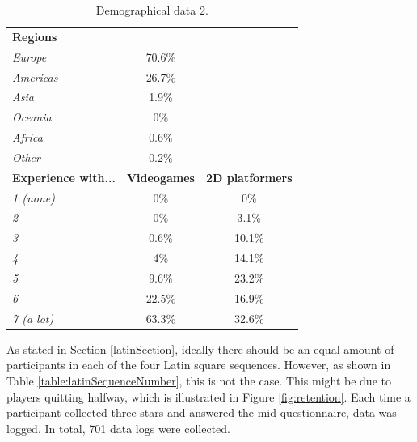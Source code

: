 \begin{table} \centering
\small
\caption{Demographical data 2.}
\label{table:demographics2}
\begin{tabular}{lcc}
\toprule
\textbf{Regions}                      &                & \textbf{}               \\ 
\textit{Europe}                      & 70.6\%         &                         \\
\textit{Americas}                    & 26.7\%         &                         \\
\textit{Asia}                        & 1.9\%          &                         \\
\textit{Oceania}                     & 0\%            &                         \\
\textit{Africa}                      & 0.6\%          &                         \\
\textit{Other}                       & 0.2\%          &                         \\
\textbf{Experience with...} & \textbf{Videogames} & \textbf{2D platformers} \\
\textit{1 (none)}                           & 0\%            & 0\%                     \\
\textit{2}                           & 0\%            & 3.1\%                   \\ 
\textit{3}                           & 0.6\%          & 10.1\%                  \\
\textit{4}                           & 4\%            & 14.1\%                  \\ 
\textit{5}                           & 9.6\%          & 23.2\%                  \\ 
\textit{6}                           & 22.5\%         & 16.9\%                  \\
\textit{7 (a lot)}                           & 63.3\%         & 32.6\%                  \\
\bottomrule
\end{tabular}
\end{table}

As stated in Section \ref{latinSection}, ideally there should be an equal amount of participants in each of the four Latin square sequences. However, as shown in Table \ref{table:latinSequenceNumber}, this is not the case. This might be due to players quitting halfway, which is illustrated in Figure \ref{fig:retention}. Each time a participant collected three stars and answered the mid-questionnaire, data was logged. In total, 701 data logs were collected.

